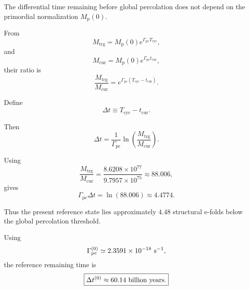 The differential time remaining before global percolation does not depend on
the primordial normalization
\(M_{\mathrm p}(0)\).

From
\begin{equation}
    M_{\mathrm{trg}}
    =
    M_{\mathrm p}(0)
    e^{\Gamma_{\mathrm{pc}}T_{\mathrm{cyc}}},
\end{equation}
and
\begin{equation}
    M_{\mathrm{cur}}
    =
    M_{\mathrm p}(0)
    e^{\Gamma_{\mathrm{pc}}t_{\mathrm{cur}}},
\end{equation}
their ratio is
\begin{equation}
    \frac{
        M_{\mathrm{trg}}
    }{
        M_{\mathrm{cur}}
    }
    =
    e^{
        \Gamma_{\mathrm{pc}}
        \left(
            T_{\mathrm{cyc}}
            -
            t_{\mathrm{cur}}
        \right)
    }.
\end{equation}

Define
\begin{equation}
    \Delta t
    \equiv
    T_{\mathrm{cyc}}
    -
    t_{\mathrm{cur}}.
\end{equation}

Then
\begin{equation}
    \boxed{
    \Delta t
    =
    \frac{
        1
    }{
        \Gamma_{\mathrm{pc}}
    }
    \ln
    \left(
        \frac{
            M_{\mathrm{trg}}
        }{
            M_{\mathrm{cur}}
        }
    \right).
    }
    \label{eq:AU_remaining_time_general}
\end{equation}

Using
\begin{equation}
    \frac{
        M_{\mathrm{trg}}
    }{
        M_{\mathrm{cur}}
    }
    =
    \frac{
        8.6208\times10^{77}
    }{
        9.7957\times10^{75}
    }
    \approx
    88.006,
\end{equation}
gives
\begin{equation}
    \boxed{
    \Gamma_{\mathrm{pc}}
    \Delta t
    =
    \ln(88.006)
    \approx
    4.4774.
    }
    \label{eq:AU_remaining_efolds}
\end{equation}

Thus the present reference state lies approximately
\(4.48\)
structural e-folds below the global percolation threshold.

Using
\begin{equation}
    \Gamma_{\mathrm{pc}}^{(0)}
    \simeq
    2.3591\times10^{-18}
    \ {\rm s^{-1}},
\end{equation}
the reference remaining time is
\begin{equation}
    \boxed{
    \Delta t^{(0)}
    \approx
    60.14
    \ {\rm billion\ years}.
    }
    \label{eq:AU_remaining_time_reference}
\end{equation}

